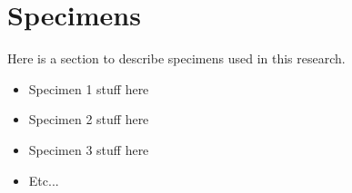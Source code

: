 \chapter{Specimens}
Here is a section to describe specimens used in this research.

\begin{itemize}
\item Specimen 1 stuff here
\item Specimen 2 stuff here
\item Specimen 3 stuff here
\item Etc...
\end{itemize}

